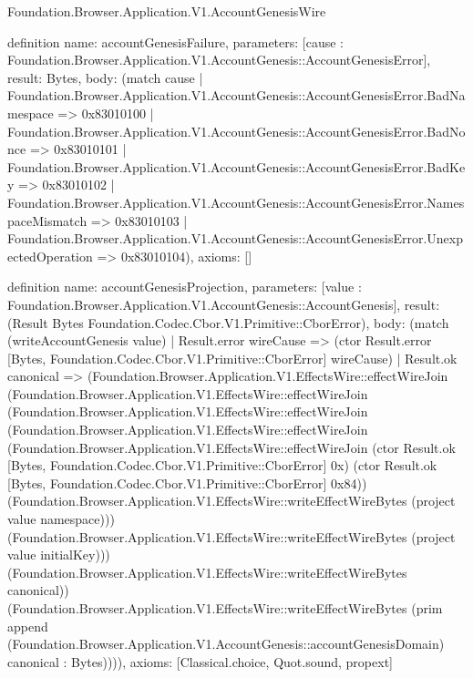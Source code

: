 \begin{lexlean}{Foundation.Browser.Application.V1.AccountGenesisWire}
\begin{semanticmodule}
definition{
  name: accountGenesisFailure,
  parameters: [cause : Foundation.Browser.Application.V1.AccountGenesis::AccountGenesisError],
  result: Bytes,
  body: (match cause
    | Foundation.Browser.Application.V1.AccountGenesis::AccountGenesisError.BadNamespace => 0x83010100
    | Foundation.Browser.Application.V1.AccountGenesis::AccountGenesisError.BadNonce => 0x83010101
    | Foundation.Browser.Application.V1.AccountGenesis::AccountGenesisError.BadKey => 0x83010102
    | Foundation.Browser.Application.V1.AccountGenesis::AccountGenesisError.NamespaceMismatch => 0x83010103
    | Foundation.Browser.Application.V1.AccountGenesis::AccountGenesisError.UnexpectedOperation => 0x83010104),
  axioms: []
}

definition{
  name: accountGenesisProjection,
  parameters: [value : Foundation.Browser.Application.V1.AccountGenesis::AccountGenesis],
  result: (Result Bytes Foundation.Codec.Cbor.V1.Primitive::CborError),
  body: (match (writeAccountGenesis value)
    | Result.error wireCause => (ctor Result.error [Bytes, Foundation.Codec.Cbor.V1.Primitive::CborError] wireCause)
    | Result.ok canonical => (Foundation.Browser.Application.V1.EffectsWire::effectWireJoin (Foundation.Browser.Application.V1.EffectsWire::effectWireJoin (Foundation.Browser.Application.V1.EffectsWire::effectWireJoin (Foundation.Browser.Application.V1.EffectsWire::effectWireJoin (Foundation.Browser.Application.V1.EffectsWire::effectWireJoin (ctor Result.ok [Bytes, Foundation.Codec.Cbor.V1.Primitive::CborError] 0x) (ctor Result.ok [Bytes, Foundation.Codec.Cbor.V1.Primitive::CborError] 0x84)) (Foundation.Browser.Application.V1.EffectsWire::writeEffectWireBytes (project value namespace))) (Foundation.Browser.Application.V1.EffectsWire::writeEffectWireBytes (project value initialKey))) (Foundation.Browser.Application.V1.EffectsWire::writeEffectWireBytes canonical)) (Foundation.Browser.Application.V1.EffectsWire::writeEffectWireBytes (prim append (Foundation.Browser.Application.V1.AccountGenesis::accountGenesisDomain) canonical : Bytes)))),
  axioms: [Classical.choice, Quot.sound, propext]
}


\end{semanticmodule}
\end{lexlean}
